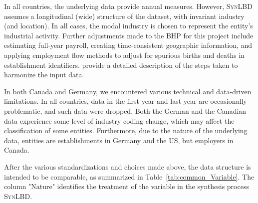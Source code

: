 \documentclass[10pt,twoside]{article}
\newcommand{\SynLBD}{\textsc{SynLBD}}
\begin{document}
In all countries, the underlying data provide annual measures. However, \SynLBD{} assumes a longitudinal (wide) structure of the dataset, with invariant industry (and location). In all cases, the modal industry is chosen to represent the entity's industrial activity. 
Further adjustments made to the \ac{BHP} for this project include estimating full-year payroll, creating time-consistent geographic information, and applying employment flow methods \citep{RePEc:iab:iabfme:201006_en} to adjust for spurious births and deaths in establishment identifiers. \citet{SJIAOS-2014b} provide a detailed description of the steps taken to harmonize the input data. 


In both Canada and Germany, we encountered various technical and data-driven limitations. In all countries, data in the first year and last year are occasionally problematic, and such data  were dropped. 
Both the German and the Canadian data experience some level of industry coding change, which may affect the classification of some entities. Furthermore, due to the nature of the underlying data, entities are establishments in Germany and the US, but employers in Canada. 

After the various standardizations and choices made above, the data structure is intended to be comparable, as summarized in Table~\ref{tab:common_Variable}. The column "Nature" identifies the treatment of the variable in the synthesis process \SynLBD. 
\end{document}
